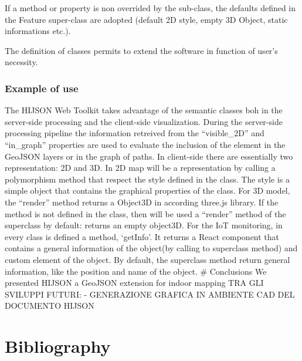 \documentclass[]{article}
\begin{document}
If a method or property is non overrided by the sub-class, the defaults
defined in the Feature super-class are adopted (default 2D style, empty
3D Object, static informations etc.).

The definition of classes permits to extend the software in function of
user's necessity.

\subsubsection{Example of use}\label{example-of-use}

The HIJSON Web Toolkit takes advantage of the semantic classes boh in
the server-side processing and the client-side visualization. During the
server-side processing pipeline the information retreived from the
``visible\_2D'' and ``in\_graph'' properties are used to evaluate the
inclusion of the element in the GeoJSON layers or in the graph of paths.
In client-side there are essentially two representation: 2D and 3D. In
2D map will be a representation by calling a polymorphism method that
respect the style defined in the class. The style is a simple object
that contains the graphical properties of the class. For 3D model, the
``render'' method returns a Object3D in according three.js library. If
the method is not defined in the class, then will be used a ``render''
method of the superclass by default: returns an empty object3D. For the
IoT monitoring, in every class is defined a method, `getInfo'. It
returns a React component that contains a general information of the
object(by calling to superclass method) and custom element of the
object. By default, the superclass method return general information,
like the position and name of the object. \# Conclusions We presented
HIJSON a GeoJSON extension for indoor mapping TRA GLI SVILUPPI FUTURI: -
GENERAZIONE GRAFICA IN AMBIENTE CAD DEL DOCUMENTO HIJSON

\section{Bibliography}\label{bibliography}
\end{document}
